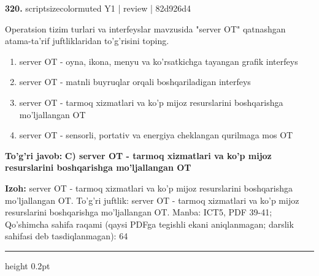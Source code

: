 \documentclass[10pt,a4paper]{article}
\begin{document}
{\bfseries\sffamily\color{ink} 320.} {scriptsizecolor{muted} Y1 | review | 82d926d4}
\par
Operatsion tizim turlari va interfeyslar mavzusida "server OT" qatnashgan atama-ta'rif juftliklaridan to'g'risini toping.
\begin{enumerate}[label=\Alph*),leftmargin=9mm]
\item server OT - oyna, ikona, menyu va ko'rsatkichga tayangan grafik interfeys
\item server OT - matnli buyruqlar orqali boshqariladigan interfeys
\item server OT - tarmoq xizmatlari va ko'p mijoz resurslarini boshqarishga mo'ljallangan OT
\item server OT - sensorli, portativ va energiya cheklangan qurilmaga mos OT
\end{enumerate}
\begin{tcolorbox}[enhanced,breakable,colback=teal!4,colframe=teal!60!black,boxrule=0.45pt,arc=1.2mm,left=2.7mm,right=2.7mm,top=1.8mm,bottom=1.8mm,before skip=2mm,after skip=2mm]
{\bfseries\sffamily\color{teal}To'g'ri javob:} \textbf{C) server OT - tarmoq xizmatlari va ko'p mijoz resurslarini boshqarishga mo'ljallangan OT}
\par\smallskip
{\bfseries Izoh:} server OT - tarmoq xizmatlari va ko'p mijoz resurslarini boshqarishga mo'ljallangan OT. To'g'ri juftlik: server OT - tarmoq xizmatlari va ko'p mijoz resurslarini boshqarishga mo'ljallangan OT. Manba: ICT5, PDF 39-41; Qo'shimcha sahifa raqami (qaysi PDFga tegishli ekani aniqlanmagan; darslik sahifasi deb tasdiqlanmagan): 64
\end{tcolorbox}
\vspace{2mm}\hrule height 0.2pt\vspace{3mm}
\end{document}
